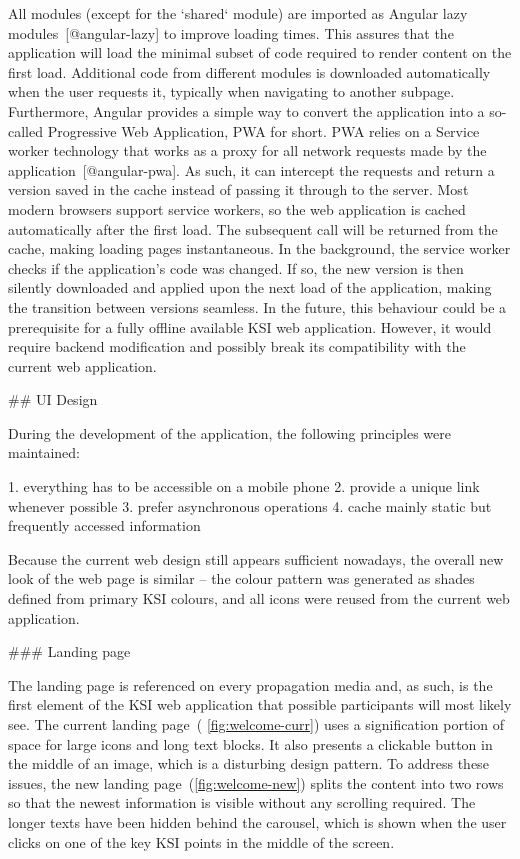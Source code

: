 \documentclass[
  digital, %
  oneside, %
  lof,     %
  nolot,     %
]{fithesis4}
\begin{document}
{All modules (except for the `shared` module) are imported as Angular lazy modules~[@angular-lazy] to improve loading times. This assures that the application will load the minimal subset of code required to render content on the first load. Additional code from different modules is downloaded automatically when the user requests it, typically when navigating to another subpage. Furthermore, Angular provides a simple way to convert the application into a so-called Progressive Web Application, PWA for short. PWA relies on a Service worker technology that works as a proxy for all network requests made by the application~[@angular-pwa]. As such, it can intercept the requests and return a version saved in the cache instead of passing it through to the server. Most modern browsers support service workers, so the web application is cached automatically after the first load. The subsequent call will be returned from the cache, making loading pages instantaneous. In the background, the service worker checks if the application's code was changed. If so, the new version is then silently downloaded and applied upon the next load of the application, making the transition between versions seamless. In the future, this behaviour could be a prerequisite for a fully offline available KSI web application. However, it would require backend modification and possibly break its compatibility with the current web application.

## UI Design

During the development of the application, the following principles were maintained:

1. everything has to be accessible on a mobile phone
2. provide a unique link whenever possible
3. prefer asynchronous operations
4. cache mainly static but frequently accessed information

Because the current web design still appears sufficient nowadays, the overall new look of the web page is similar -- the colour pattern was generated as shades defined from primary KSI colours, and all icons were reused from the current web application.

### Landing page

The landing page is referenced on every propagation media and, as such, is the first element of the KSI web application that possible participants will most likely see. The current landing page~( \autoref{fig:welcome-curr}) uses a signification portion of space for large icons and long text blocks. It also presents a clickable button in the middle of an image, which is a disturbing design pattern. To address these issues, the new landing page~(\autoref{fig:welcome-new}) splits the content into two rows so that the newest information is visible without any scrolling required. The longer texts have been hidden behind the carousel, which is shown when the user clicks on one of the key KSI points in the middle of the screen.

}
\end{document}
